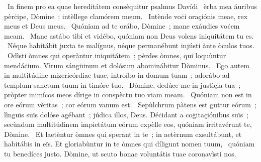 {~In finem pro ea quae hereditátem consèquitur psalmus Davídi}
{%
~èrba mea áuribus pèrċipe, Dòmine~; intèllege clamórem meum.
~Intènde voċi oraçiónis meae, rex meus et Deus meus.
~Quóniam ad te orábo, Dòmine~; mane exáudies voċem meam.
~Mane astábo tìbi et vidébo, quóniam non Deus volens iniquitátem tu es.
~Néque habitábit juxta te malígnus, néque permanébunt injústi ànte òculos tuos.
~Odìsti òmnes qui operàntur iniquitátem~; pèrdes òmnes, qui loquùntur mendáċium. Vìrum sángüinum et dolósum abominábitur Dòminus.
~Ego autem in multitúdine mizericórdiae tuae, introíbo in domum tuam~; adorábo ad templum sanctum tuum in timóre tuo.
~Dòmine, dedúce me in justìçia tua~; pròpter inimícos meos dírige in conspèctu tuo viam meam.
~Quóniam non est in ore eórum vèritas~; cor eórum vanum est.
~Sepùlchrum pàtens est guttur eórum~; lìnguïs suïs dolóse agébant~; júdica illos, Deus. Déċidant a coġitaçiónibus suïs~; secùndum multitúdinem impietátum eórum expèlle eos, quóniam irritavérunt te, Dòmine.
~Et laetèntur òmnes qui sperant in te~; in aetèrnum exsultábunt, et habitábis in eïs. Et gloriabùntur in te òmnes qui díligunt nomen tuum,
~quóniam tu benedíces justo. Dòmine, ut scuto bonae voluntátis tuae coronavìsti nos.
}
